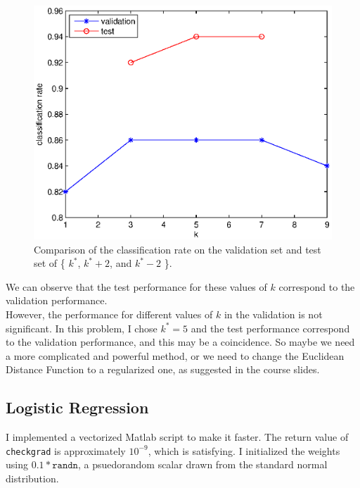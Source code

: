 \documentclass{article}
\begin{document}
\begin{figure}[ht]
\centering
\includegraphics[width=\textwidth]{kstarnn.eps}
\caption{Comparison of the classification rate on the validation set and test set of \{ $k^*$, $k^*+2$, and $k^*-2$ \}. 
\label{fig:kstarnn}}
\end{figure}


We can observe that the test performance for these values of $k$ correspond to the validation performance. \\

However, the performance for different values of $k$ in the validation is not significant. In this problem, I chose $k^* = 5$ and the test performance correspond to the validation performance, and this may be a coincidence. So maybe we need a more complicated and powerful method, or we need to change the Euclidean Distance Function to a regularized one, as suggested in the course slides.\\

\subsection{Logistic Regression}

I implemented a vectorized Matlab script to make it faster. The return value of \texttt{checkgrad} is approximately $10^{-9}$, which is satisfying. I initialized the weights using $0.1 * \texttt{randn}$, a psuedorandom scalar drawn from the standard normal distribution. \\
\end{document}
